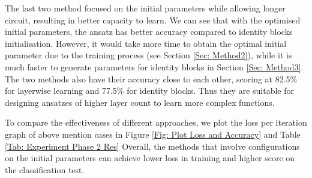
The last two method focused on the initial parameters while allowing longer circuit, resulting in better capacity to learn.
We can see that with the optimised initial parameters, the ansatz has better accuracy compared to identity blocks initialisation.
However, it would take more time to obtain the optimal initial parameter due to the training process (see Section \ref{Sec: Method2}), while it is much faster to generate parameters for identity blocks in Section \ref{Sec: Method3}.
The two methods also have their accuracy close to each other, scoring at 82.5\% for layerwise learning and 77.5\% for identity blocks.
Thus they are suitable for designing ansatzes of higher layer count to learn more complex functions.


To compare the effectiveness of different approaches, we plot the loss per iteration graph of above mention cases in Figure \ref{Fig: Plot Loss and Accuracy} and Table \ref{Tab: Experiment Phase 2 Res}
Overall, the methods that involve configurations on the initial parameters can achieve lower loss in training and higher score on the classification test.

